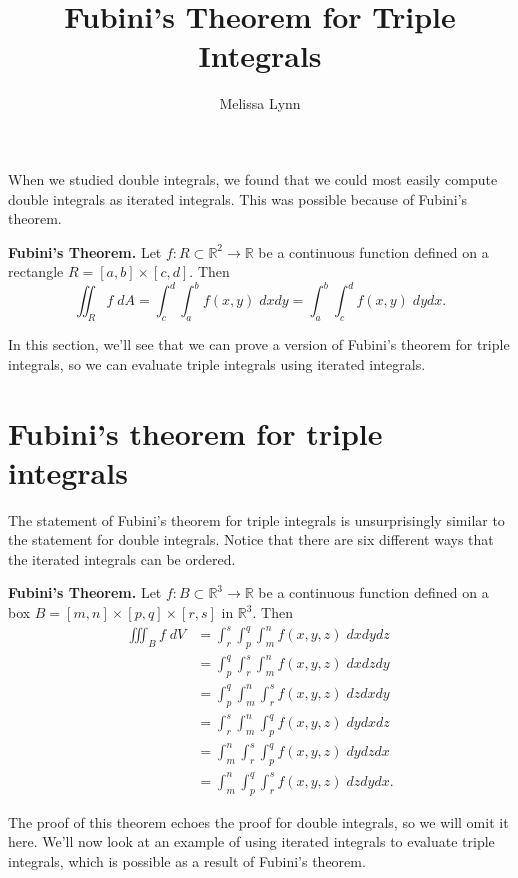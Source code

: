 \documentclass{ximera}
\title{Fubini's Theorem for Triple Integrals}
\author{Melissa Lynn}
\begin{document}
  
\begin{abstract}  
\end{abstract}  
\maketitle  

When we studied double integrals, we found that we could most easily compute double integrals as iterated integrals. This was possible because of Fubini's theorem.

\begin{theorem}
\textbf{Fubini's Theorem.} Let $f:R\subset\mathbb{R}^2\rightarrow\mathbb{R}$ be a continuous function defined on a rectangle $R = [a,b]\times [c,d]$. Then
\[
\iint_R f\;dA = \int_c^d\int_a^b f(x,y)\;dxdy = \int_a^b\int_c^d f(x,y)\;dydx.
\]
\end{theorem}

In this section, we'll see that we can prove a version of Fubini's theorem for triple integrals, so we can evaluate triple integrals using iterated integrals.

\section*{Fubini's theorem for triple integrals}

The statement of Fubini's theorem for triple integrals is unsurprisingly similar to the statement for double integrals. Notice that there are six different ways that the iterated integrals can be ordered.

\begin{theorem}
\textbf{Fubini's Theorem.} Let $f:B\subset\mathbb{R}^3\rightarrow\mathbb{R}$ be a continuous function defined on a box $B= [m,n]\times[p,q]\times[r,s]$ in $\mathbb{R}^3$. Then
\begin{align*}
\iiint_B f\;dV &= \int_r^s\int_p^q\int_m^n f(x,y,z)\;dxdydz\\
&= \int_p^q\int_r^s\int_m^n f(x,y,z)\;dxdzdy\\
&= \int_p^q\int_m^n\int_r^s f(x,y,z)\;dzdxdy\\
&= \int_r^s\int_m^n\int_p^q f(x,y,z)\;dydxdz\\
&= \int_m^n\int_r^s\int_p^q f(x,y,z)\;dydzdx\\
&= \int_m^n\int_p^q\int_r^s f(x,y,z)\;dzdydx.
\end{align*}
\end{theorem}

The proof of this theorem echoes the proof for double integrals, so we will omit it here. We'll now look at an example of using iterated integrals to evaluate triple integrals, which is possible as a result of Fubini's theorem.
\end{document}
